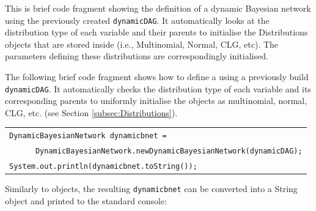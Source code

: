 This is brief code fragment showing the definition of a dynamic Bayesian network using the previously created \texttt{dynamicDAG}. It automatically looks at the distribution type of each variable and their parents to initialise the Distributions objects that are stored inside (i.e., Multinomial, Normal, CLG, etc). The parameters defining these distributions are correspondingly initialised.

The following brief code fragment shows how to define a  using a previously build \texttt{dynamicDAG}. It automatically checks the distribution type of each variable and its corresponding parents to uniformly initialise the  objects as multinomial, normal, CLG, etc. (see Section \ref{subsec:Distributions}).


\begin{table}[H]
\begin{tabular}{l} \hline  
        \texttt{DynamicBayesianNetwork dynamicbnet =}\\ \texttt{~~~~~~DynamicBayesianNetwork.newDynamicBayesianNetwork(dynamicDAG);}\\ 
        \texttt{System.out.println(dynamicbnet.toString());}\\ \hline 
\end{tabular}
\end{table}      


Similarly to  objects, the resulting \texttt{dynamicbnet} can be converted into a String object and printed to the standard console:

